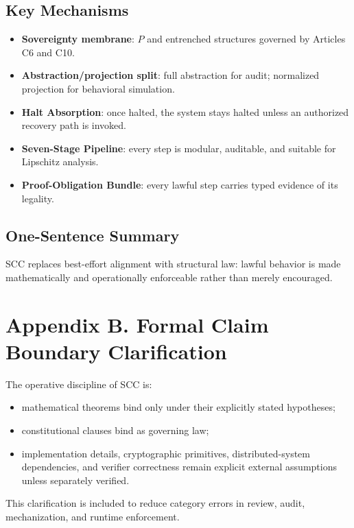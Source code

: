 \documentclass[10pt,oneside]{article}
\theoremstyle{definition}
\theoremstyle{remark}
\begin{document}
\subsection*{Key Mechanisms}
\begin{itemize}
  \item \textbf{Sovereignty membrane}: \(P\) and entrenched structures governed by Articles C6 and C10.
  \item \textbf{Abstraction/projection split}: full abstraction for audit; normalized projection for behavioral simulation.
  \item \textbf{Halt Absorption}: once halted, the system stays halted unless an authorized recovery path is invoked.
  \item \textbf{Seven-Stage Pipeline}: every step is modular, auditable, and suitable for Lipschitz analysis.
  \item \textbf{Proof-Obligation Bundle}: every lawful step carries typed evidence of its legality.
\end{itemize}

\subsection*{One-Sentence Summary}
SCC replaces best-effort alignment with structural law: lawful behavior is made mathematically and operationally enforceable rather than merely encouraged.

\section{Appendix B. Formal Claim Boundary Clarification}
The operative discipline of SCC is:
\begin{itemize}
  \item mathematical theorems bind only under their explicitly stated hypotheses;
  \item constitutional clauses bind as governing law;
  \item implementation details, cryptographic primitives, distributed-system dependencies, and verifier correctness remain explicit external assumptions unless separately verified.
\end{itemize}
This clarification is included to reduce category errors in review, audit, mechanization, and runtime enforcement.
\end{document}
